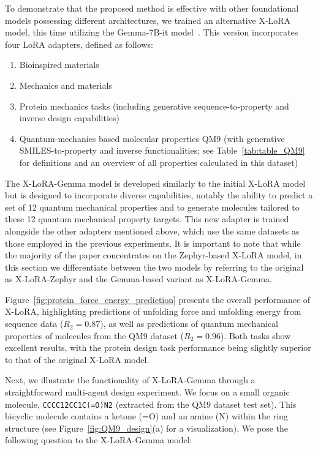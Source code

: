 To demonstrate that the proposed method is effective with other foundational models possessing different architectures, we trained an alternative X-LoRA model, this time utilizing the Gemma-7B-it model~\cite{Google/gemma-7b-itFace}. This version incorporates four LoRA adapters, defined as follows:

\begin{enumerate}
    \item Bioinspired materials \item Mechanics and materials \item Protein mechanics tasks (including generative sequence-to-property and inverse design capabilities) \item Quantum-mechanics based molecular properties QM9 (with generative SMILES-to-property and inverse functionalities; see Table~\ref{tab:table_QM9} for definitions and an overview of all properties calculated in this dataset)~\cite{Ruddigkeit2012EnumerationGDB-17,Ramakrishnan2015ElectronicSpace}
\end{enumerate}

The X-LoRA-Gemma model is developed similarly to the initial X-LoRA model but is designed to incorporate diverse capabilities, notably the ability to predict a set of 12 quantum mechanical properties and to generate molecules tailored to these 12 quantum mechanical property targets. This new adapter is trained alongside the other adapters mentioned above, which use the same datasets as those employed in the previous experiments. It is important to note that while the majority of the paper concentrates on the Zephyr-based X-LoRA model, in this section we differentiate between the two models by referring to the original as X-LoRA-Zephyr and the Gemma-based variant as X-LoRA-Gemma.

Figure~\ref{fig:protein_force_energy_prediction} presents the overall performance of X-LoRA, highlighting predictions of unfolding force and unfolding energy from sequence data ($R_2 = 0.87$), as well as predictions of quantum mechanical properties of molecules from the QM9 dataset ($R_2 = 0.96$). Both tasks show excellent results, with the protein design task performance being slightly superior to that of the original X-LoRA model.

Next, we illustrate the functionality of X-LoRA-Gemma through a straightforward multi-agent design experiment. We focus on a small organic molecule, \texttt{CCCC12CC1C(=O)N2} (extracted from the QM9 dataset test set). This bicyclic molecule contains a ketone (=O) and an amine (N) within the ring structure (see Figure~\ref{fig:QM9_design}(a) for a visualization). We pose the following question to the X-LoRA-Gemma model:

